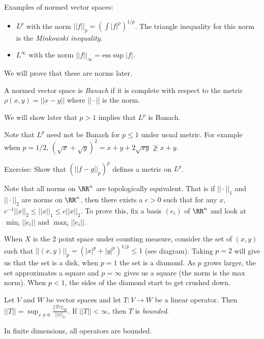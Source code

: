 \documentclass{../uva7310}
\begin{document}
Examples of normed vector spaces:
\begin{itemize}
    \item \(L^p\) with the norm \(||f||_p={\left(\int|f|^p \right)}^{1/p}\). The triangle inequality for this norm is
    the \textit{Minkowski inequality}.
    \item \(L^\infty \) with the norm \(||f||_\infty =\text{ess}\sup |f|\).
\end{itemize}
We will prove that these are norms later.

\begin{definition}
    A normed vector space is \textit{Banach} if it is complete with respect to the metric \(\rho(x,y)=||x-y||\) where
    \(||\cdot||\) is the norm.
\end{definition}

We will show later that \(p>1\) implies that \(L^p\) is Banach.

Note that \(L^p\) need not be Banach for \(p\leq 1\) under usual metric. For example when \(p=1/2\),
\({(\sqrt{x}+\sqrt{y})}^2=x+y+2\sqrt{xy}\not\geq x+y\).

Exercise: Show that \({(||f-g||_p)}^p\) defines a metric on \(L^p\).

Note that all norms on \(\RR^n\) are topologically equivalent. That is if \(||\cdot||_1\) and \(||\cdot||_2\) are norms
on \(\RR^n\), then there exists a \(c>0\) such that for any \(x\), \(c^{-1}||x||_2\leq||x||_1\leq c||x||_2\). To prove
this, fix a basis \((e_i)\) of \(\RR^n\) and look at \(\min_i ||e_i||\) and \(\max_i ||e_i||\).

When \(X\) is the 2 point space under counting measure, consider the set of \( (x,y)\) such that
\(||(x,y)||_p={(|x|^p+|y|^p)}^{1/p}\leq 1\) (see diagram). Taking \(p=2\) will give us that the set is a disk, when
\(p=1\) the set is a diamond. As \(p\) grows larger, the set approximates a square and \(p=\infty\) gives us a square
(the norm is the max norm). When \(p<1\), the sides of the diamond start to get crushed down.

\begin{definition}
    Let \(V\) and \(W\) be vector spaces and let \(T:V\rightarrow W\) be a linear operator. Then
    \(||T||=\sup_{v\neq 0} \frac{||Tv||_W}{||v||_V}\). If \(||T||<\infty \), then \(T\) is \textit{bounded}.
\end{definition}

In finite dimensions, all operators are bounded.
\end{document}
